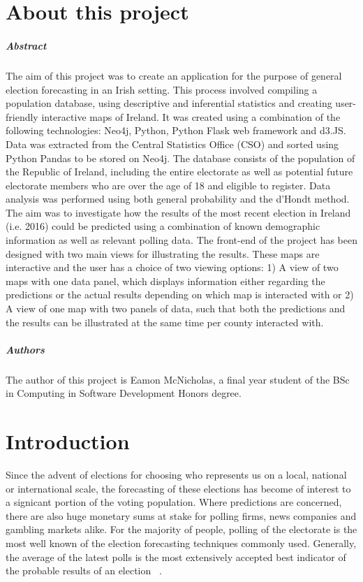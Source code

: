 
\chapter*{About this project}
\paragraph{Abstract}
The aim of this project was to create an application for the purpose of general election forecasting in an Irish setting. This process involved compiling a population database, using descriptive and inferential statistics and creating user-friendly interactive maps of Ireland. It was created using a 
combination of the following technologies: Neo4j, Python, Python Flask web framework and d3.JS. Data was extracted from the Central Statistics Office (CSO) and sorted using Python Pandas to be stored on Neo4j. The database consists of the population of the Republic of Ireland, including the entire electorate as well as potential future electorate members who are over the age of 18 and eligible to register. Data analysis was performed using both general probability and the d’Hondt method. The aim was to investigate how the results of the most recent election in Ireland (i.e. 2016) could be predicted using a combination of known demographic information as well as relevant polling data. The front-end of the project has been designed with two main views for illustrating the results. These maps are interactive and the user has a choice of two viewing options: 1) A view of two maps with one data panel, which displays information either regarding the predictions or the actual results depending on which map is interacted with or  2) A view of one map with two panels of data, such that both the predictions and the results can be illustrated at the same time per county interacted with.

\paragraph{Authors}
The author of this project is Eamon McNicholas, a final year student of the BSc in Computing in Software Development Honors degree. 




\chapter{Introduction}

Since the advent of elections for choosing who represents us on a local, national or international scale, the forecasting of these elections has become of interest to a signicant portion of the voting population. Where predictions are concerned, there are also huge monetary sums at stake for polling firms, news companies and gambling markets alike. For the majority of  people, polling of the electorate is the most well known of the election forecasting techniques commonly used. Generally,  the average of the latest polls is the most extensively accepted best indicator of the probable results of an election ~\cite{stegmaier}.

